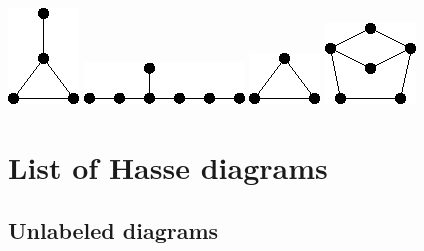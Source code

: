 \documentclass[11pt,paper=b5,footinclude,headinclude]{scrbook} %
\theoremstyle{remark}
\theoremstyle{definition} %
\theoremstyle{theorem} %
\begin{document}
\includegraphics[scale=0.5,frame]{smallGraphs/g_paw.png}     
\includegraphics[scale=0.5,frame]{smallGraphs/g_skewstar.png}     
\includegraphics[scale=0.5,frame]{smallGraphs/g_triangle.png}     
\includegraphics[scale=0.5,frame]{smallGraphs/g_twinC5.png}     


\chapter{List of Hasse diagrams}
\section{Unlabeled diagrams\hfill\label{sec:hasse}}
\end{document}
